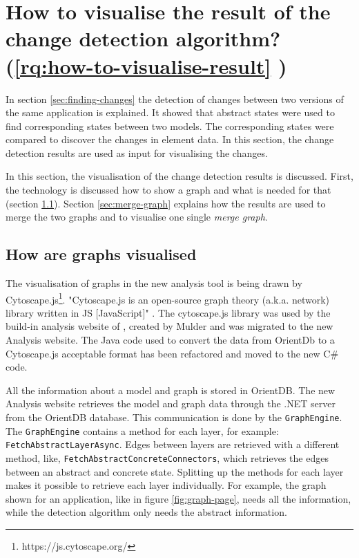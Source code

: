 \section{How to visualise the result of the change detection algorithm? (\ref{rq:how-to-visualise-result} )} \label{rq:type-visualisation-answer}

In section \ref{sec:finding-changes} the detection of changes between two versions of the same application is explained. It showed that abstract states were used to find corresponding states between two models. The corresponding states were compared to discover the changes in element data. In this section, the change detection results are used as input for visualising the changes. 

In this section, the visualisation of the change detection results is discussed. First, the technology is discussed how to show a graph and what is needed for that (section \ref{sec:graph-visualisation}). Section \ref{sec:merge-graph} explains how the results are used to merge the two graphs and to visualise one single \textit{merge graph}.

\subsection{How are graphs visualised} \label{sec:graph-visualisation}

The visualisation of graphs in the new analysis tool is being drawn by Cytoscape.js\footnote{https://js.cytoscape.org/}. "Cytoscape.js is an open-source graph theory (a.k.a. network) library written in JS [JavaScript]" \cite{cytoscape-js}. The cytoscape.js library was used by the build-in analysis website of \testar, created by Mulder \cite{thesisMulders} and was migrated to the new Analysis website. The Java code used to convert the data from OrientDb to a Cytoscape.js acceptable format has been refactored and moved to the new C\# code.

All the information about a model and graph is stored in OrientDB. The new Analysis website retrieves the model and graph data through the \testar .NET server from the OrientDB database. This communication is done by the \verb|GraphEngine|. The \verb|GraphEngine| contains a method for each \testar layer, for example: \verb|FetchAbstractLayerAsync|. Edges between layers are retrieved with a different method, like, \verb|FetchAbstractConcreteConnectors|, which retrieves the edges between an abstract and concrete state. Splitting up the methods for each layer makes it possible to retrieve each layer individually. For example, the graph shown for an application, like in figure \ref{fig:graph-page}, needs all the information, while the detection algorithm only needs the abstract information. 

